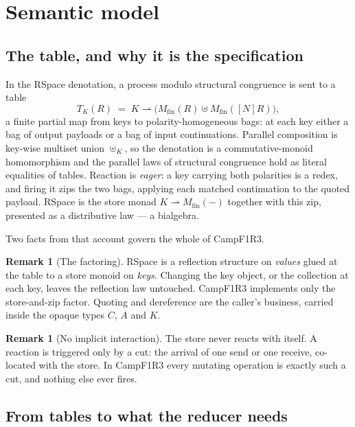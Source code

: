 \documentclass[11pt]{article}
\theoremstyle{plain}
\theoremstyle{definition}
\newtheorem{remark}[proposition]{Remark}
\newcommand{\Camp}{CampF1R3}
\newcommand{\Mfin}{M_{\mathrm{fin}}}
\newcommand{\rr}{\rightharpoonup}
\begin{document}
\section{Semantic model}\label{sec:semantics}

\subsection{The table, and why it is the specification}

In the RSpace denotation, a process modulo structural congruence is sent to a
table
\[
  T_K(R) \;=\; K \rr \big(\Mfin(R)\uplus\Mfin([N]R)\big),
\]
a finite partial map from keys to polarity-homogeneous bags: at each key either a
bag of output payloads or a bag of input continuations. Parallel composition is
key-wise multiset union $\uplus_K$, so the denotation is a commutative-monoid
homomorphism and the parallel laws of structural congruence hold as literal
equalities of tables. Reaction is \emph{eager}: a key carrying both polarities is
a redex, and firing it zips the two bags, applying each matched continuation to
the quoted payload. RSpace is the store monad $K\rr\Mfin(-)$ together with this
zip, presented as a distributive law --- a bialgebra.

Two facts from that account govern the whole of \Camp{}.

\begin{remark}[The factoring]\label{rem:factoring}
RSpace is a reflection structure on \emph{values} glued at the table to a store
monoid on \emph{keys}. Changing the key object, or the collection at each key,
leaves the reflection law untouched. \Camp{} implements only the store-and-zip
factor. Quoting and dereference are the caller's business, carried inside the
opaque types $C$, $A$ and $K$.
\end{remark}

\begin{remark}[No implicit interaction]\label{rem:noimplicit}
The store never reacts with itself. A reaction is triggered only by a cut: the
arrival of one send or one receive, co-located with the store. In \Camp{} every
mutating operation is exactly such a cut, and nothing else ever fires.
\end{remark}

\subsection{From tables to what the reducer needs}
\end{document}
